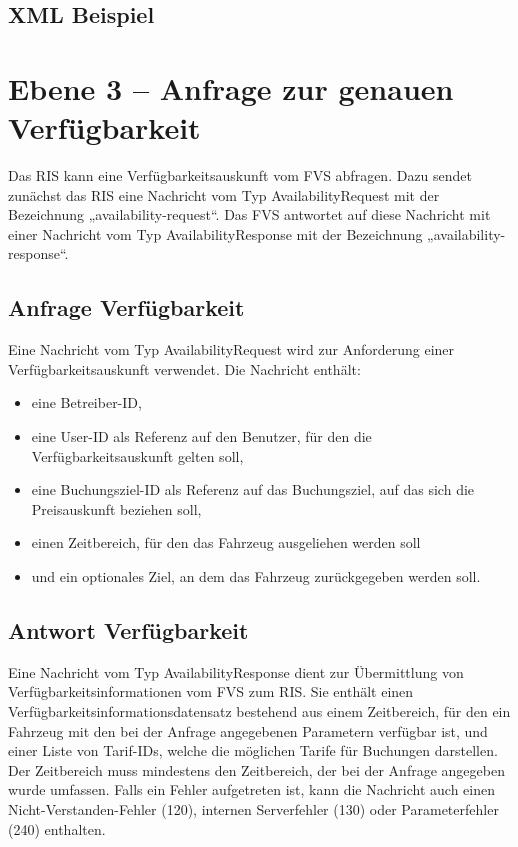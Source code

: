 

\subsection{XML Beispiel}

\section{Ebene 3 -- Anfrage zur genauen Verfügbarkeit}
Das RIS kann eine Verfügbarkeitsauskunft vom FVS abfragen. Dazu sendet zunächst das RIS eine Nachricht vom Typ AvailabilityRequest mit der Bezeichnung „availability-request“. Das FVS antwortet auf diese Nachricht mit einer Nachricht vom Typ AvailabilityResponse mit der Bezeichnung „availability-response“.



\subsection{Anfrage Verfügbarkeit}
Eine Nachricht vom Typ AvailabilityRequest wird zur Anforderung einer Verfügbarkeitsauskunft verwendet. Die Nachricht enthält:
\begin{itemize}
\item eine Betreiber-ID,
\item eine User-ID als Referenz auf den Benutzer, für den die Verfügbarkeitsauskunft gelten soll,
\item eine Buchungsziel-ID als Referenz auf das Buchungsziel, auf das sich die Preisauskunft beziehen soll,
\item einen Zeitbereich, für den das Fahrzeug ausgeliehen werden soll
\item und ein optionales Ziel, an dem das Fahrzeug zurückgegeben werden soll.
\end{itemize}



\subsection{Antwort Verfügbarkeit}
Eine Nachricht vom Typ AvailabilityResponse dient zur Übermittlung von Verfügbarkeitsinformationen vom FVS zum RIS. Sie enthält einen Verfügbarkeitsinformationsdatensatz bestehend aus einem Zeitbereich, für den ein Fahrzeug mit den bei der Anfrage angegebenen Parametern verfügbar ist, und einer Liste von Tarif-IDs, welche die möglichen Tarife für Buchungen darstellen. Der Zeitbereich muss mindestens den Zeitbereich, der bei der Anfrage angegeben wurde umfassen. Falls ein Fehler aufgetreten ist, kann die Nachricht auch einen Nicht-Verstanden-Fehler (120), internen Serverfehler (130) oder Parameterfehler (240) enthalten.

